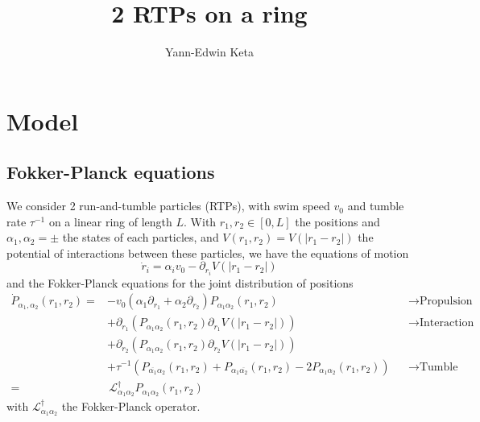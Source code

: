 \documentclass[pre,aps,superscriptaddress,nofootinbib]{revtex4}
\begin{document}
\title{2 RTPs on a ring}
\author{Yann-Edwin Keta}
\maketitle


\nocite{Slowman2016, Nemoto2016, Chetrite2015}

\section{Model}

\subsection{Fokker-Planck equations}

We consider 2 run-and-tumble particles (RTPs), with swim speed $v_0$ and tumble rate $\tau^{-1}$ on a linear ring of length $L$. With $r_1, r_2 \in [0, L]$ the positions and $\alpha_1, \alpha_2 = \pm$ the states of each particles, and $V(r_1, r_2) = V(|r_1 - r_2|)$ the potential of interactions between these particles, we have the equations of motion
\begin{equation}
\dot{r}_i = \alpha_i v_0 - \partial_{r_i} V(|r_1 - r_2|)
\label{EOM}
\end{equation}
and the Fokker-Planck equations for the joint distribution of positions
\begin{equation}
\begin{aligned}
\dot{P}_{\alpha_1, \alpha_2}(r_1, r_2) =
  &- v_0(\alpha_1 \partial_{r_1} + \alpha_2 \partial_{r_2}) P_{\alpha_1\alpha_2}(r_1, r_2)
    &&\to \text{Propulsion}\\
  &+ \partial_{r_1} (P_{\alpha_1\alpha_2}(r_1, r_2)\partial_{r_1}V(|r_1 - r_2|))
    &&\to \text{Interaction}\\
  &+ \partial_{r_2} (P_{\alpha_1\alpha_2}(r_1, r_2)\partial_{r_2}V(|r_1 - r_2|))
    &&\\
  &+ \tau^{-1} (P_{\overline{\alpha_1}\alpha_2}(r_1, r_2) + P_{\alpha_1\overline{\alpha_2}}(r_1, r_2) - 2 P_{\alpha_1\alpha_2}(r_1, r_2))
    &&\to \text{Tumble}\\
  =& \, \mathcal{L}^{\dagger}_{\alpha_1\alpha_2} P_{\alpha_1\alpha_2}(r_1, r_2)
\end{aligned}
\label{FP0}
\end{equation}
with $\mathcal{L}^{\dagger}_{\alpha_1\alpha_2}$ the Fokker-Planck operator.\\
\end{document}
